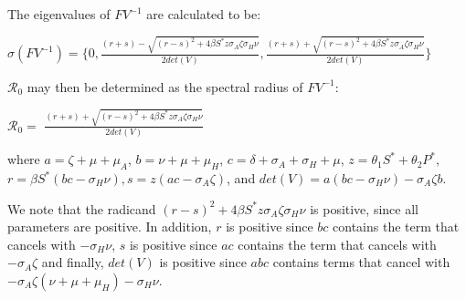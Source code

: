 \documentclass[12pt]{article}
\begin{document}
The eigenvalues of $FV^{-1}$ are calculated to be: 
\begin{center}
$\sigma (FV^{-1}) = \{0, \frac{(r+s)-\sqrt{(r-s)^2+4\beta S^* z  \sigma_A \zeta \sigma_H \nu}}{2det(V)} 
, \frac{(r+s)+\sqrt{(r-s)^2+4\beta S^* z  \sigma_A \zeta \sigma_H \nu}}{2det(V)} 
\}$
\end{center}

$\mathscr{R}_0$ may then be determined as the spectral radius of $FV^{-1}$:
\begin{center}
$\mathscr{R}_0=$ $\frac{(r+s)+\sqrt{(r-s)^2+4\beta S^* z  \sigma_A \zeta \sigma_H \nu}}{2det(V)} $
\end{center}
where $a=\zeta +\mu + \mu_A$, $b=\nu + \mu + \mu_H$, $c=\delta + \sigma_A + \sigma_H +\mu$, $z=\theta_1 S^* + \theta_2 P^*$, $ r=\beta S^* (bc-\sigma_H \nu), s=z(ac-\sigma_{A} \zeta)$, and $det(V)=a(bc-\sigma_H\nu)-\sigma_A\zeta b$.

We note that the radicand $(r-s)^2+4\beta S^* z  \sigma_A \zeta \sigma_H \nu$ is positive, since all parameters are positive. In addition, $r$ is positive since $bc$ contains the term that cancels with $-\sigma_{H} \nu$,  $s$ is positive since $ac$ contains the term that cancels with $-\sigma_{A} \zeta$ and finally, $det(V)$ is positive since $abc$ contains terms that cancel with $-\sigma_A\zeta(\nu+\mu+\mu_H)-\sigma_H\nu$. 







 
\end{document}
